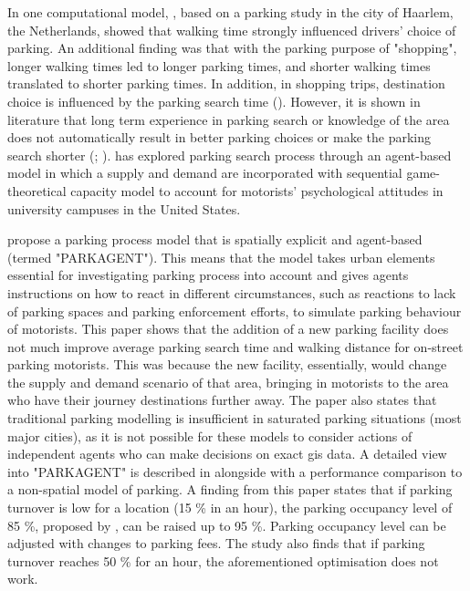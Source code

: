 In one computational model, , based on a parking study in the city of Haarlem, the Netherlands, showed that walking time strongly influenced drivers' choice of parking. An additional finding was that with the parking purpose of "shopping", longer walking times led to longer parking times, and shorter walking times translated to shorter parking times. In addition, in shopping trips, destination choice is influenced by the parking search time (\cite{Axhausen1993}). However, it is shown in literature that long term experience in parking search or knowledge of the area does not automatically result in better parking choices or make the parking search shorter (\cite{Thompson1998}; \cite{Teng2002}).  has explored parking search process through an agent-based model in which a supply and demand are incorporated with sequential game-theoretical capacity model to account for motorists' psychological attitudes in university campuses in the United States. 

 propose a parking process model that is spatially explicit and agent-based (termed "PARKAGENT"). This means that the model takes urban elements essential for investigating parking process into account and gives agents instructions on how to react in different circumstances, such as reactions to lack of parking spaces and parking enforcement efforts, to simulate parking behaviour of motorists. This paper shows that the addition of a new parking facility does not much improve average parking search time and walking distance for on-street parking motorists. This was because the new facility, essentially, would change the supply and demand scenario of that area, bringing in motorists to the area who have their journey destinations further away. The paper also states that traditional parking modelling is insufficient in saturated parking situations (most major cities), as it is not possible for these models to consider actions of independent agents who can make decisions on exact \acrfull{gis} data. A detailed view into "PARKAGENT" is described in  alongside with a performance comparison to a non-spatial model of parking. A finding from this paper states that if parking turnover is low for a location (15 \% in an hour), the parking occupancy level of 85 \%, proposed by , can be raised up to 95 \%. Parking occupancy level can be adjusted with changes to parking fees. The study also finds that if parking turnover reaches 50 \% for an hour, the aforementioned optimisation does not work.

